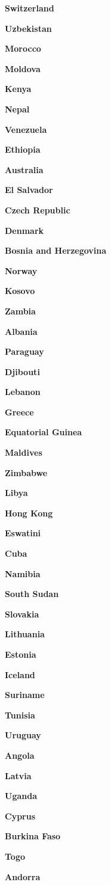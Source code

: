 \textbf{Switzerland}

\textbf{Uzbekistan}

\textbf{Morocco}

\textbf{Moldova}

\textbf{Kenya}

\textbf{Nepal}

\textbf{Venezuela}

\textbf{Ethiopia}

\textbf{Australia}

\textbf{El Salvador}

\textbf{Czech Republic}

\textbf{Denmark}

\textbf{Bosnia and Herzegovina}

\textbf{Norway}

\textbf{Kosovo}

\textbf{Zambia}

\textbf{Albania}

\textbf{Paraguay}

\textbf{Djibouti}

\textbf{Lebanon}

\textbf{Greece}

\textbf{Equatorial Guinea}

\textbf{Maldives}

\textbf{Zimbabwe}

\textbf{Libya}

\textbf{Hong Kong}

\textbf{Eswatini}

\textbf{Cuba}

\textbf{Namibia}

\textbf{South Sudan}

\textbf{Slovakia}

\textbf{Lithuania}

\textbf{Estonia}

\textbf{Iceland}

\textbf{Suriname}

\textbf{Tunisia}

\textbf{Uruguay}

\textbf{Angola}

\textbf{Latvia}

\textbf{Uganda}

\textbf{Cyprus}

\textbf{Burkina Faso}

\textbf{Togo}

\textbf{Andorra}

